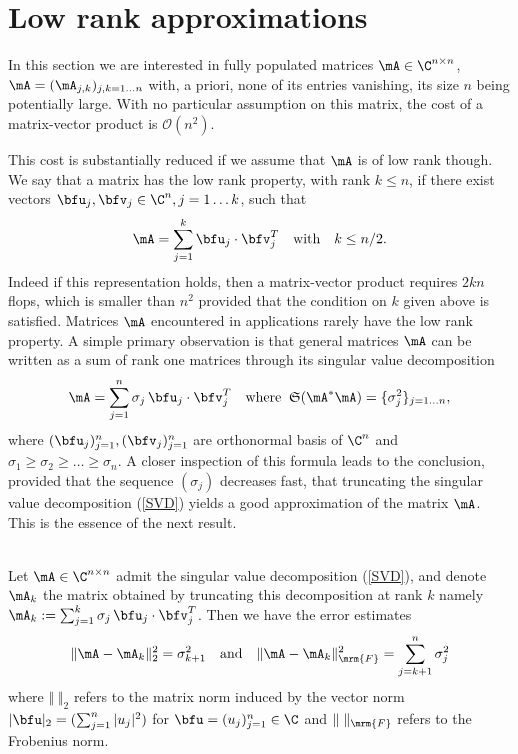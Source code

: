 


\section{Low rank approximations}
\label{sec:LowRankApprox}

In this section we are interested in fully populated matrices $\mA\in \C^{n\times n}$, $\mA = (\mA_{j,k})_{j,k=1\dots n}$ with, a priori, 
none of its entries vanishing, its size $n$ being potentially large. With no particular assumption on this matrix, the cost of a 
matrix-vector product is $\mathcal{O}(n^{2})$. 

\bigskip
This cost is substantially reduced if we assume that $\mA$ is of low rank though. We say that a matrix has the low rank property, 
with rank $k\leq n$, if there exist vectors $\bfu_{j},\bfv_{j}\in \C^{n}, j=1\dots k$, such that 
$$
\mA = \sum_{j=1}^{k}\bfu_{j}\cdot\bfv_{j}^{T}\quad \textrm{with}\quad k\leq n/2.
$$ 
Indeed if this representation holds, then a matrix-vector product requires $2 k n$ flops, which is smaller than $n^{2}$ provided 
that the condition on $k$ given above is satisfied. Matrices $\mA$ encountered in applications rarely have the low rank property. 
A simple primary observation is that general matrices $\mA$ can be written as a sum of rank one matrices through its singular value
decomposition
\begin{equation}\label{SVD}
\mA = \sum_{j=1}^{n}\sigma_{j}\,\bfu_{j}\cdot\bfv_{j}^{T}\quad \textrm{where}\;\; \mathfrak{S}(\mA^{*}\mA) = \{\sigma_{j}^{2}\}_{j=1\dots n},
\end{equation}
where $(\bfu_{j})_{j=1}^{n}, (\bfv_{j})_{j=1}^{n}$ are orthonormal basis of $\C^{n}$ and $\sigma_{1}\geq \sigma_{2}\geq \dots \geq \sigma_{n}$. 
A closer inspection of this formula leads to the conclusion, provided that the sequence $(\sigma_{j})$  decreases fast, that 
truncating the singular value decomposition (\ref{SVD}) yields a good approximation of the matrix $\mA$. This is the essence of 
the next result.

\begin{proposition}\quad\\
Let $\mA\in \C^{n\times n}$ admit the singular value decomposition (\ref{SVD}), and denote $\mA_{k}$ the 
matrix obtained by truncating this decomposition at rank $k$ namely $\mA_{k}:=\sum_{j=1}^{k}\sigma_{j}\,\bfu_{j}
\cdot\bfv_{j}^{T}$. Then we have the error estimates
$$
\Vert \mA - \mA_{k}\Vert_{2}^{2} = \sigma_{k+1}^{2}
\quad\textrm{and}\quad 
\Vert \mA - \mA_{k}\Vert_{\mrm{F}}^{2} = \sum_{j=k+1}^{n}\sigma_{j}^{2}
$$
where $\Vert \;\Vert_{2}$ refers to the matrix norm induced by the vector norm $\vert \bfu\vert_{2} = (\sum_{j=1}^{n}\vert u_{j}\vert^{2})$ 
for $\bfu = (u_{j})_{j=1}^{n}\in \C$ and $\Vert \;\Vert_{\mrm{F}}$ refers to the Frobenius norm.
\end{proposition}

